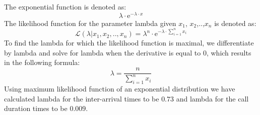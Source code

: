\documentclass[12pt,a4paper]{article}
\begin{document}
The exponential function is denoted as:
\begin{equation} \lambda\cdot\mathrm{e}^{-\lambda\cdot x} \end{equation}
The likelihood function for the parameter lambda given $x_1$, $x_2$,..,$x_n$ is denoted as:
\begin{equation} \mathcal{L}(\lambda|x_1, x_2,..,x_n) = \lambda^{n}\cdot\mathrm{e}^{-\lambda\cdot \sum_{i=1}^{n} x_i} \end{equation}
To find the lambda for which the likelihood function is maximal, we differentiate by lambda and solve for lambda when the derivative is equal to 0, which results in the following formula:
\begin{equation} \lambda=\dfrac{n}{\sum_{i=1}^{n} x_i} \end{equation}
Using maximum likelihood function of an exponential distribution we have calculated lambda for the inter-arrival times to be $0.73$ and lambda for the call duration times to be $0.009$.
\end{document}
